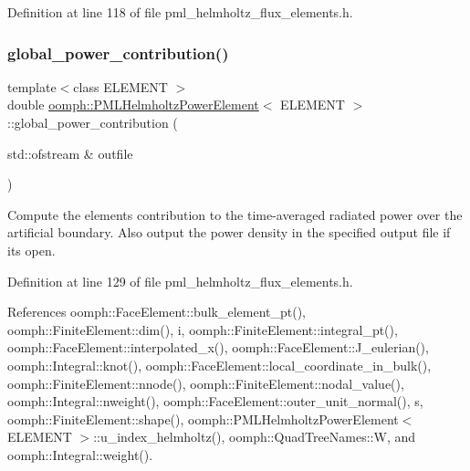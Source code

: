 Definition at line 118 of file pml\+\_\+helmholtz\+\_\+flux\+\_\+elements.\+h.

\mbox{\label{classoomph_1_1PMLHelmholtzPowerElement_a2576f9adb9c0570b973084e68a8df857}} 
\subsubsection{\texorpdfstring{global\+\_\+power\+\_\+contribution()}{global\_power\_contribution()}\hspace{0.1cm}{\footnotesize\ttfamily [2/2]}}
{\footnotesize\ttfamily template$<$class E\+L\+E\+M\+E\+NT $>$ \\
double \hyperlink{classoomph_1_1PMLHelmholtzPowerElement}{oomph\+::\+P\+M\+L\+Helmholtz\+Power\+Element}$<$ E\+L\+E\+M\+E\+NT $>$\+::global\+\_\+power\+\_\+contribution (\begin{DoxyParamCaption}\item[{std\+::ofstream \&}]{outfile }\end{DoxyParamCaption})\hspace{0.3cm}{\ttfamily [inline]}}



Compute the element\textquotesingle{}s contribution to the time-\/averaged radiated power over the artificial boundary. Also output the power density in the specified output file if it\textquotesingle{}s open. 



Definition at line 129 of file pml\+\_\+helmholtz\+\_\+flux\+\_\+elements.\+h.



References oomph\+::\+Face\+Element\+::bulk\+\_\+element\+\_\+pt(), oomph\+::\+Finite\+Element\+::dim(), i, oomph\+::\+Finite\+Element\+::integral\+\_\+pt(), oomph\+::\+Face\+Element\+::interpolated\+\_\+x(), oomph\+::\+Face\+Element\+::\+J\+\_\+eulerian(), oomph\+::\+Integral\+::knot(), oomph\+::\+Face\+Element\+::local\+\_\+coordinate\+\_\+in\+\_\+bulk(), oomph\+::\+Finite\+Element\+::nnode(), oomph\+::\+Finite\+Element\+::nodal\+\_\+value(), oomph\+::\+Integral\+::nweight(), oomph\+::\+Face\+Element\+::outer\+\_\+unit\+\_\+normal(), s, oomph\+::\+Finite\+Element\+::shape(), oomph\+::\+P\+M\+L\+Helmholtz\+Power\+Element$<$ E\+L\+E\+M\+E\+N\+T $>$\+::u\+\_\+index\+\_\+helmholtz(), oomph\+::\+Quad\+Tree\+Names\+::W, and oomph\+::\+Integral\+::weight().

